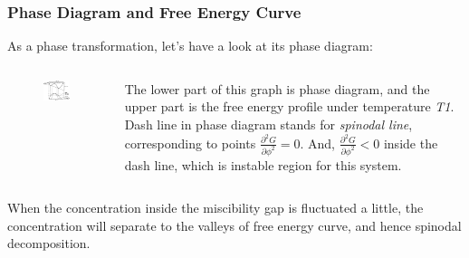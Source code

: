 \documentclass[compress,xcolor={dvipsnames}]{beamer}
\begin{document}
\begin{frame}
    \frametitle{Phase Diagram and Free Energy Curve}

    As a phase transformation, let's have a look at its phase diagram:\vspace{-5pt}
    \begin{columns}
        \begin{column}{.5\linewidth}
            \begin{figure}
                \includegraphics[width=1.\linewidth]{pic/energy_pd.jpg}
            \end{figure}
        \end{column}
        \begin{column}{.5\linewidth}
            The lower part of this graph is phase diagram, and the upper part is the free energy profile under temperature \emph{T1}. Dash line in phase diagram stands for \emph{spinodal line}, corresponding to points \(\frac{\partial ^2 G}{\partial \phi ^2} = 0\). And, \(\frac{\partial ^2 G}{\partial \phi ^2} < 0\) inside the dash line, which is instable region for this system.
        \end{column}
    \end{columns}
    \vspace{5pt}
    When the concentration inside the miscibility gap is fluctuated a little, the concentration will separate to the valleys of free energy curve, and hence spinodal decomposition.

\end{frame}
\end{document}

